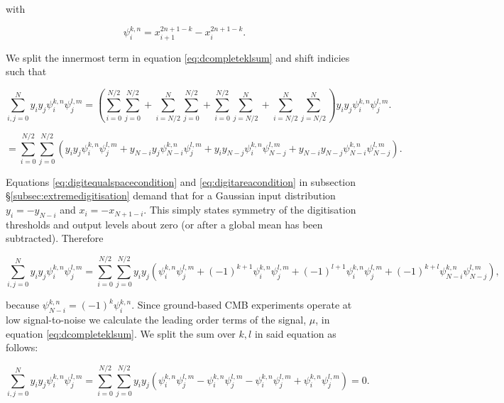 \documentclass[a4paper,fleqn,usenatbib]{mnras}
\begin{document}
with

\begin{equation}
\psi_i^{k,n} = x_{i+1}^{2n+1-k} - x_{i}^{2n+1-k}.
\end{equation}

We split the innermost term in equation \ref{eq:dcompleteklsum} and shift indicies such that

\begin{equation}
\sum_{i,j = 0}^N y_i y_j \psi_i^{k, n} \psi_j^{l, m} = \left( \sum_{i = 0}^{N/2}\sum_{j = 0}^{N/2} + \sum_{i = N/2}^{N}\sum_{j = 0}^{N/2} + \sum_{i = 0}^{N/2}\sum_{j = N/2}^{N} + \sum_{i = N/2}^{N}\sum_{j = N/2}^{N} \right) y_i y_j \psi_i^{k, n} \psi_j^{l, m}.
\end{equation}

\begin{equation}
= \sum_{i = 0}^{N/2}\sum_{j = 0}^{N/2} \left( y_i y_j \psi_i^{k, n} \psi_j^{l, m} +  y_{N-i} y_j \psi_{N-i}^{k, n} \psi_j^{l, m} + y_i y_{N-j} \psi_i^{k, n} \psi_{N-j}^{l, m} + y_{N-i} y_{N-j} \psi_{N-i}^{k, n} \psi_{N-j}^{l, m} \right).
\end{equation}

Equations \ref{eq:digitequalspacecondition} and \ref{eq:digitareacondition} in subsection \S\ref{subsec:extremedigitisation} demand that for a Gaussian input distribution $y_i = -y_{N-i}$ and $x_i = -x_{N+1-i}$. This simply states symmetry of the digitisation thresholds and output levels about zero (or after a global mean has been subtracted). Therefore

\begin{equation} \label{eq:ijsumpsiflip}
\sum_{i,j = 0}^N y_i y_j \psi_i^{k, n} \psi_j^{l, m} = \sum_{i = 0}^{N/2}\sum_{j = 0}^{N/2} y_i y_j \left( \psi_i^{k, n} \psi_j^{l, m} + (-1)^{k+1} \psi_{i}^{k, n} \psi_j^{l, m} + (-1)^{l+1} \psi_i^{k, n} \psi_{j}^{l, m} + (-1)^{k+l} \psi_{N-i}^{k, n} \psi_{N-j}^{l, m} \right),
\end{equation}

because $\psi_{N-i}^{k,n} = (-1)^{k} \psi_{i}^{k,n}$. Since ground-based CMB experiments operate at low signal-to-noise we calculate the leading order terms of the signal, $\mu$, in equation \ref{eq:dcompleteklsum}. We split the sum over $k, l$ in said equation as follows:

\begin{equation}
\sum_{i,j = 0}^N y_i y_j \psi_i^{k, n} \psi_j^{l, m} = \sum_{i = 0}^{N/2}\sum_{j = 0}^{N/2} y_i y_j  \left( \psi_i^{k, n} \psi_j^{l, m} - \psi_{i}^{k, n} \psi_j^{l, m} - \psi_i^{k, n} \psi_{j}^{l, m} + \psi_{i}^{k, n} \psi_{j}^{l, m} \right) = 0 .
\end{equation}
\end{document}
